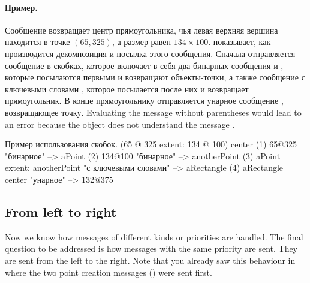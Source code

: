 \documentclass[a4paper,10pt,twoside]{book}
\begin{document}
\paragraph{Пример.}
Сообщение  возвращает центр прямоугольника, чья левая верхняя вершина находится в точке $(65, 325)$, а размер равен $134{\times}100$.  показывает, как производится декомпозиция и посылка этого сообщения. Сначала отправляется сообщение в скобках, которое включает в себя два бинарных сообщения  и , которые посылаются первыми и возвращают объекты-точки, а также сообщение с ключевыми словами , которое посылается после них и возвращает прямоугольник. В конце прямоугольнику отправляется унарное сообщение , возвращающее точку.
Evaluating the message without parentheses would lead to an error because the object  does not understand the message .

\begin{example}[decExtent]{Пример использования скобок.}{}
      (65 @ 325 extent: 134 @ 100) center
(1)   65@325                                                    "бинарное"
    --> aPoint
(2)                                134@100                     "бинарное"
                                 --> anotherPoint
(3)   aPoint extent: anotherPoint                       "с ключевыми словами"
      --> aRectangle
(4)   aRectangle center                                     "унарное"
      --> 132@375
\end{example}

\subsection{From left to right}
Now we know how messages of different kinds or priorities are handled. The final question to be addressed is how messages with the same priority are sent. They are sent from the left to the right. Note that you already saw this behaviour in  where the two point creation messages () were sent first.
\end{document}
